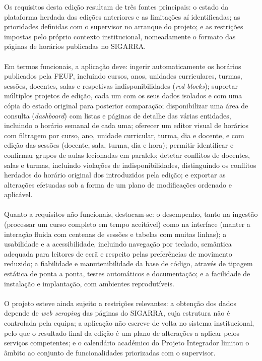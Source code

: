 \documentclass[10pt]{article}
\begin{document}
    Os requisitos desta edição resultam de três fontes principais: o estado da plataforma herdada das edições anteriores e as limitações aí identificadas; as prioridades definidas com o supervisor no arranque do projeto; e as restrições impostas pelo próprio contexto institucional, nomeadamente o formato das páginas de horários publicadas no SIGARRA.
    \\\\
    Em termos funcionais, a aplicação deve: ingerir automaticamente os horários publicados pela FEUP, incluindo cursos, anos, unidades curriculares, turmas, sessões, docentes, salas e respetivas indisponibilidades (\emph{red blocks}); suportar múltiplos projetos de edição, cada um com os seus dados isolados e com uma cópia do estado original para posterior comparação; disponibilizar uma área de consulta (\emph{dashboard}) com listas e páginas de detalhe das várias entidades, incluindo o horário semanal de cada uma; oferecer um editor visual de horários com filtragem por curso, ano, unidade curricular, turma, dia e docente, e com edição das sessões (docente, sala, turma, dia e hora); permitir identificar e confirmar grupos de aulas lecionadas em paralelo; detetar conflitos de docentes, salas e turmas, incluindo violações de indisponibilidades, distinguindo os conflitos herdados do horário original dos introduzidos pela edição; e exportar as alterações efetuadas sob a forma de um plano de modificações ordenado e aplicável.
    \\\\
    Quanto a requisitos não funcionais, destacam-se: o desempenho, tanto na ingestão (processar um curso completo em tempo aceitável) como na interface (manter a interação fluida com centenas de sessões e tabelas com muitas linhas); a usabilidade e a acessibilidade, incluindo navegação por teclado, semântica adequada para leitores de ecrã e respeito pelas preferências de movimento reduzido; a fiabilidade e manutenibilidade da base de código, através de tipagem estática de ponta a ponta, testes automáticos e documentação; e a facilidade de instalação e implantação, com ambientes reprodutíveis.
    \\\\
    O projeto esteve ainda sujeito a restrições relevantes: a obtenção dos dados depende de \emph{web scraping} das páginas do SIGARRA, cuja estrutura não é controlada pela equipa; a aplicação não escreve de volta no sistema institucional, pelo que o resultado final da edição é um plano de alterações a aplicar pelos serviços competentes; e o calendário académico do Projeto Integrador limitou o âmbito ao conjunto de funcionalidades priorizadas com o supervisor.
\end{document}
